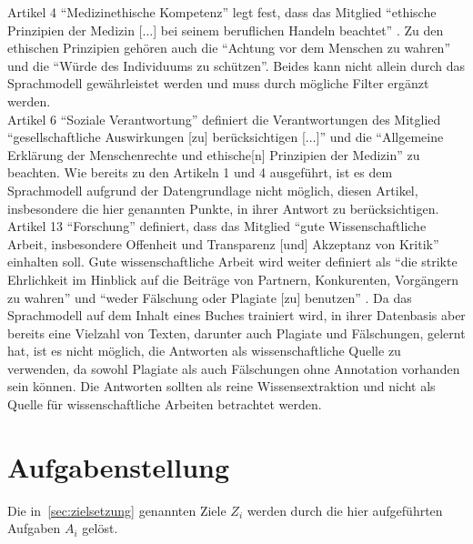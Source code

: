 Artikel 4 \enquote{Medizinethische Kompetenz} legt fest, dass das Mitglied
\enquote{ethische Prinzipien der Medizin [$\dots$] bei seinem beruflichen Handeln beachtet} \citep{gmds_eth}.
Zu den ethischen Prinzipien \citep{gmds_eth} gehören auch die \enquote{Achtung vor dem Menschen zu wahren} und die \enquote{Würde des Individuums zu schützen}.
Beides kann nicht allein durch das Sprachmodell gewährleistet werden und muss durch mögliche Filter ergänzt werden.\\

Artikel 6 \enquote{Soziale Verantwortung} definiert die Verantwortungen des Mitglied
\enquote{gesellschaftliche Auswirkungen [zu] berücksichtigen [$\dots$]} und die
\enquote{Allgemeine Erklärung der Menschenrechte und ethische[n] Prinzipien der Medizin} \citep{gmds_eth}zu beachten.
Wie bereits zu den Artikeln 1 und 4 ausgeführt, ist es dem Sprachmodell aufgrund der Datengrundlage nicht möglich, diesen Artikel, insbesondere die hier genannten Punkte, in ihrer Antwort zu berücksichtigen.\\

Artikel 13 \enquote{Forschung} definiert, dass das Mitglied \enquote{gute Wissenschaftliche Arbeit, insbesondere Offenheit und Transparenz [und] Akzeptanz von Kritik} \citep{gmds_eth} einhalten soll.
Gute wissenschaftliche Arbeit wird weiter definiert als
\enquote{die strikte Ehrlichkeit im Hinblick auf die Beiträge von Partnern, Konkurenten, Vorgängern zu wahren} und \enquote{weder Fälschung oder Plagiate [zu] benutzen} \citep{gmds_eth}.
Da das Sprachmodell auf dem Inhalt eines Buches trainiert wird, in ihrer Datenbasis aber bereits eine Vielzahl von Texten, darunter auch Plagiate und Fälschungen, gelernt hat,
ist es nicht möglich, die Antworten als wissenschaftliche Quelle zu verwenden, da sowohl Plagiate als auch Fälschungen ohne Annotation vorhanden sein können.
Die Antworten sollten als reine Wissensextraktion und nicht als Quelle für wissenschaftliche Arbeiten betrachtet werden.

\section{Aufgabenstellung}

Die in~\cref{sec:zielsetzung} genannten Ziele $Z_i$ werden durch die hier aufgeführten Aufgaben $A_i$ gelöst.

